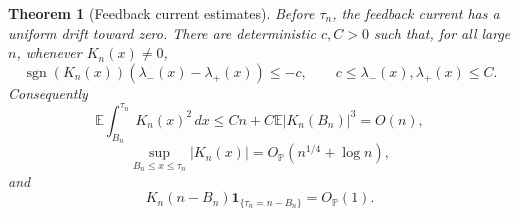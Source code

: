 \documentclass[11pt,reqno]{amsart}
\newtheorem{theorem}{Theorem}[section]
\theoremstyle{definition}
\theoremstyle{remark}
\numberwithin{equation}{section}
\newcommand{\E}{\mathbb E}
\newcommand{\Pp}{\mathbb P}
\newcommand{\sgn}{\operatorname{sgn}}
\begin{document}
\begin{theorem}[Feedback current estimates]
\label{thm:A1}
Before \(\tau_n\), the feedback current has a uniform drift toward zero.
There are deterministic \(c,C>0\) such that, for all large \(n\),
whenever \(K_n(x)\ne0\),
\begin{equation}
\sgn(K_n(x))(\lambda_-(x)-\lambda_+(x))\le-c,
\qquad
c\le\lambda_-(x),\lambda_+(x)\le C.
\label{eq:1.20}
\end{equation}
Consequently
\begin{equation}
\E\int_{B_n}^{\tau_n}K_n(x)^2\,dx
\le
Cn+C\E|K_n(B_n)|^3
=
O(n),
\label{eq:1.21}
\end{equation}
\begin{equation}
\sup_{B_n\le x\le\tau_n}|K_n(x)|
=
O_{\Pp}(n^{1/4}+\log n),
\label{eq:1.22}
\end{equation}
and
\begin{equation}
K_n(n-B_n)\mathbf 1_{\{\tau_n=n-B_n\}}
=
O_{\Pp}(1).
\label{eq:1.23}
\end{equation}
\end{theorem}
\end{document}
